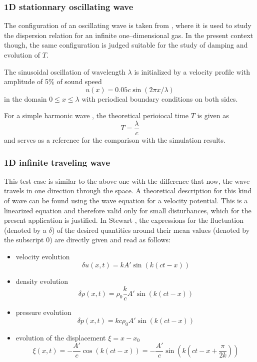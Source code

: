 \documentclass{report}
\begin{document}
\subsubsection{1D stationnary oscillating wave}
The configuration of an oscillating wave is taken from \cite{Monaghan2005}, where it is used
to study the dispersion relation for an infinite one--dimensional gas. In the present context though, the same configuration is judged suitable for the study of damping and evolution of $T$. 

The sinusoidal oscillation of wavelength $\lambda$ is initialized by a velocity profile with amplitude of 5\% of sound speed
\begin{equation}
 u(x)=0.05 c\sin(2\pi x/\lambda)
\end{equation}
in the domain $0\leq x\leq \lambda$ with periodical boundary conditions on both sides.

For a simple harmonic wave , the theoretical perioiocal time $T$ is given as \cite{Stewart1930}
\begin{equation}
 T=\frac{\lambda}{c}
\end{equation}
and serves as a reference for the comparison with the simulation results.





\subsubsection{1D infinite traveling wave}
This test case is similar to the above one with the difference that now, the wave travels in one direction through the space. A theoretical description for this kind of wave can be found using the wave equation for a velocity potential. This is a linearized equation and therefore valid only for small disturbances, which for the present application is justified.
In Stewart \cite{Stewart1930}, the expressions for the fluctuation (denoted by a $\delta$) of the desired quantities around their mean values (denoted by the subscript $0$) are directly given and read as follows:
\begin{itemize}
\item velocity evolution 
\begin{equation}
\label{eq:1DWaveDetla_u}
 \delta u(x,t)=k A\prime \sin(k(ct-x))
\end{equation}
\item density evolution 
\begin{equation}
 \delta \rho(x,t)=\rho_0\frac{k}{c} A\prime  \sin(k(ct-x))
\end{equation}
\item pressure evolution 
\begin{equation}
 \delta p(x,t)=k c \rho_0 A\prime  \sin(k(ct-x))
\end{equation}
\item evolution of the displacement $\xi=x-x_0$
\begin{equation}
\label{eq:1DWaveDisplacement}
 \xi(x,t)=-\frac{A\prime }{c} \cos(k(ct-x))=-\frac{A\prime }{c} \sin(k(ct-x+\frac{\pi}{2k}))
\end{equation}

\end{itemize}
\end{document}
